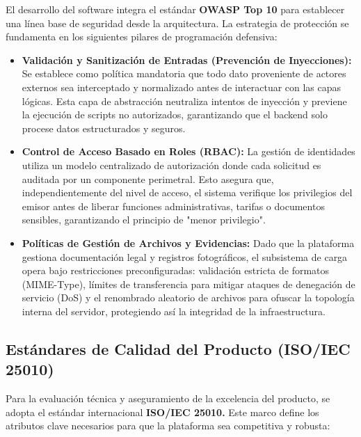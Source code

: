 El desarrollo del software integra el estándar \textbf{OWASP Top 10} para establecer una línea base de seguridad desde la arquitectura. La estrategia de protección se fundamenta en los siguientes pilares de programación defensiva: 

\begin{itemize}
	\item \textbf{Validación y Sanitización de Entradas (Prevención de Inyecciones):} Se establece como política mandatoria que todo dato proveniente de actores externos sea interceptado y normalizado antes de interactuar con las capas lógicas. Esta capa de abstracción neutraliza intentos de inyección y previene la ejecución de scripts no autorizados, garantizando que el backend solo procese datos estructurados y seguros.
	\item \textbf{Control de Acceso Basado en Roles (RBAC):} La gestión de identidades utiliza un modelo centralizado de autorización donde cada solicitud es auditada por un componente perimetral. Esto asegura que, independientemente del nivel de acceso, el sistema verifique los privilegios del emisor antes de liberar funciones administrativas, tarifas o documentos sensibles, garantizando el principio de "menor privilegio".
	\item \textbf{Políticas de Gestión de Archivos y Evidencias:} Dado que la plataforma gestiona documentación legal y registros fotográficos, el subsistema de carga opera bajo restricciones preconfiguradas: validación estricta de formatos (MIME-Type), límites de transferencia para mitigar ataques de denegación de servicio (DoS) y el renombrado aleatorio de archivos para ofuscar la topología interna del servidor, protegiendo así la integridad de la infraestructura.
\end{itemize}

\subsection{Estándares de Calidad del Producto (ISO/IEC 25010) }

Para la evaluación técnica y aseguramiento de la excelencia del producto, se adopta el estándar internacional \textbf{ISO/IEC 25010.} Este marco define los atributos clave necesarios para que la plataforma sea competitiva y robusta:

